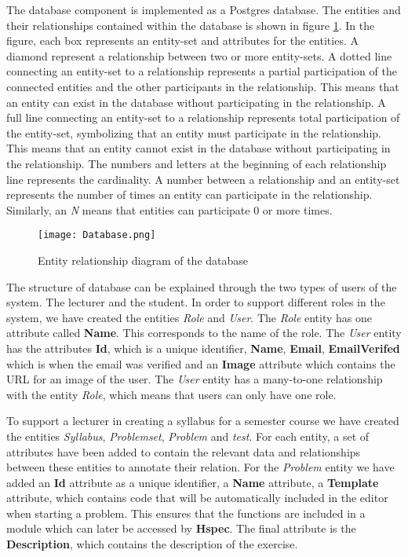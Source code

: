 The database component is implemented as a Postgres database. The entities and their relationships contained within the database is shown in figure \ref{fig:Database}. In the figure, each box represents an entity-set and attributes for the entities. A diamond represent a relationship between two or more entity-sets.
A dotted line connecting an entity-set to a relationship represents a partial participation of the connected entities and the other participants in the relationship. This means that an entity can exist in the database without participating in the relationship.
A full line connecting an entity-set to a relationship represents total participation of the entity-set, symbolizing that an entity must participate in the relationship.
This means that an entity cannot exist in the database without participating in the relationship.
The numbers and letters at the beginning of each relationship line represents the cardinality. A number between a relationship and an entity-set represents the number of times an entity can participate in the relationship. Similarly, an \textit{N} means that entities can participate $0$ or more times.

\begin{figure}[H]
	\texttt{[image: Database.png]}
	\centering
	\caption{Entity relationship diagram of the database}
	\label{fig:Database}
\end{figure}

The structure of database can be explained through the two types of users of the system. The lecturer and the student.
In order to support different roles in the system, we have created the entities \textit{Role} and \textit{User}. The \textit{Role} entity has one attribute called \textbf{Name}. This corresponds to the name of the role. The \textit{User} entity has the attributes \textbf{Id}, which is a unique identifier, \textbf{Name}, \textbf{Email}, \textbf{EmailVerifed} which is when the email was verified and an \textbf{Image} attribute which contains the URL for an image of the user. The \textit{User} entity has a many-to-one relationship with the entity \textit{Role}, which means that users can only have one role.

To support a lecturer in creating a syllabus for a semester course we have created the entities \textit{Syllabus}, \textit{Problemset}, \textit{Problem} and \textit{test}. For each entity, a set of attributes have been added to contain the relevant data and relationships between these entities to annotate their relation.
For the \textit{Problem} entity we have added an \textbf{Id} attribute as a unique identifier, a \textbf{Name} attribute, a \textbf{Template} attribute, which contains code that will be automatically included in the editor when starting a problem. This ensures that the functions are included in a module which can later be accessed by \textbf{Hspec}. The final attribute is the \textbf{Description}, which contains the description of the exercise.

